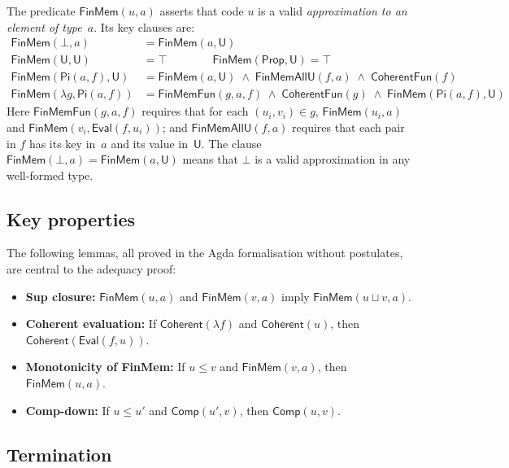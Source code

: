 \documentclass[11pt]{article}
\newcommand{\U}{\mathsf{U}}
\newcommand{\Prop}{\mathsf{Prop}}
\newcommand{\PiC}[2]{\mathsf{Pi}(#1,#2)}
\newcommand{\EvalFun}{\mathsf{Eval}}
\newcommand{\Bot}{\bot}
\begin{document}
The predicate $\mathsf{FinMem}(u, a)$ asserts that code $u$ is a valid
\emph{approximation to an element of type~$a$}.  Its key clauses are:
\begin{align*}
  \mathsf{FinMem}(\Bot, a) &= \mathsf{FinMem}(a, \U) \\
  \mathsf{FinMem}(\U, \U) &= \top  \qquad\qquad
  \mathsf{FinMem}(\Prop, \U) = \top \\
  \mathsf{FinMem}(\PiC{a}{f}, \U) &=
    \mathsf{FinMem}(a, \U) \;\wedge\;
    \mathsf{FinMemAllU}(f, a) \;\wedge\;
    \mathsf{CoherentFun}(f) \\
  \mathsf{FinMem}(\lambda g, \PiC{a}{f}) &=
    \mathsf{FinMemFun}(g, a, f) \;\wedge\;
    \mathsf{CoherentFun}(g) \;\wedge\;
    \mathsf{FinMem}(\PiC{a}{f}, \U)
\end{align*}
Here $\mathsf{FinMemFun}(g, a, f)$ requires that for each $(u_i, v_i) \in g$,
$\mathsf{FinMem}(u_i, a)$ and $\mathsf{FinMem}(v_i, \EvalFun(f, u_i))$;
and $\mathsf{FinMemAllU}(f, a)$ requires that each pair in $f$ has its key in~$a$
and its value in~$\U$.  The clause $\mathsf{FinMem}(\Bot, a) = \mathsf{FinMem}(a,\U)$
means that $\Bot$ is a valid approximation in any well-formed type.

\subsection{Key properties}

The following lemmas, all proved in the Agda formalisation without postulates,
are central to the adequacy proof:
\begin{itemize}
\item \textbf{Sup closure:} $\mathsf{FinMem}(u,a)$ and $\mathsf{FinMem}(v,a)$
  imply $\mathsf{FinMem}(u \sqcup v, a)$.
\item \textbf{Coherent evaluation:} If $\mathsf{Coherent}(\lambda f)$ and
  $\mathsf{Coherent}(u)$, then $\mathsf{Coherent}(\EvalFun(f, u))$.
\item \textbf{Monotonicity of FinMem:} If $u \leq v$ and
  $\mathsf{FinMem}(v, a)$, then $\mathsf{FinMem}(u, a)$.
\item \textbf{Comp-down:} If $u \leq u'$ and $\mathsf{Comp}(u', v)$,
  then $\mathsf{Comp}(u, v)$.
\end{itemize}

\subsection{Termination}
\end{document}
